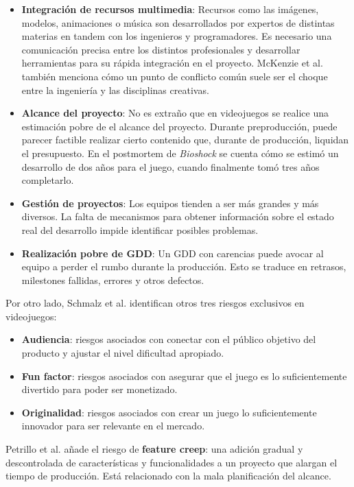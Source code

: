 \begin{itemize}
    \item \textbf{Integración de recursos multimedia}: Recursos como las imágenes, modelos, animaciones o música son desarrollados por expertos de distintas materias en tandem con los ingenieros y programadores. Es necesario una comunicación precisa entre los distintos profesionales y desarrollar herramientas para su rápida integración en el proyecto. McKenzie et al. también menciona cómo un punto de conflicto común suele ser el choque entre la ingeniería y las disciplinas creativas.
    \item \textbf{Alcance del proyecto}: No es extraño que en videojuegos se realice una estimación pobre de el alcance del proyecto. Durante preproducción, puede parecer factible realizar cierto contenido que, durante de producción, liquidan el presupuesto. En el postmortem de \textit{Bioshock}\cite{bioshock} se cuenta cómo se estimó un desarrollo de dos años para el juego, cuando finalmente tomó tres años completarlo.
    \item \textbf{Gestión de proyectos}: Los equipos tienden a ser más grandes y más diversos. La falta de mecanismos para obtener información sobre el estado real del desarrollo impide identificar posibles problemas.
    \item \textbf{Realización pobre de GDD}: Un GDD con carencias puede avocar al equipo a perder el rumbo durante la producción. Esto se traduce en retrasos, milestones fallidas, errores y otros defectos.
\end{itemize}

Por otro lado, Schmalz et al. identifican otros tres riesgos exclusivos en videojuegos:

\begin{itemize}
    \item \textbf{Audiencia}: riesgos asociados con conectar con el público objetivo del producto y ajustar el nivel dificultad apropiado.
    \item \textbf{Fun factor}: riesgos asociados con asegurar que el juego es lo suficientemente divertido para poder ser monetizado.
    \item \textbf{Originalidad}: riesgos asociados con crear un juego lo suficientemente innovador para ser relevante en el mercado.
\end{itemize}

Petrillo et al.\cite{petrillo} añade el riesgo de \textbf{feature creep}: una adición gradual y descontrolada de características y funcionalidades a un proyecto que alargan el tiempo de producción. Está relacionado con la mala planificación del alcance.

